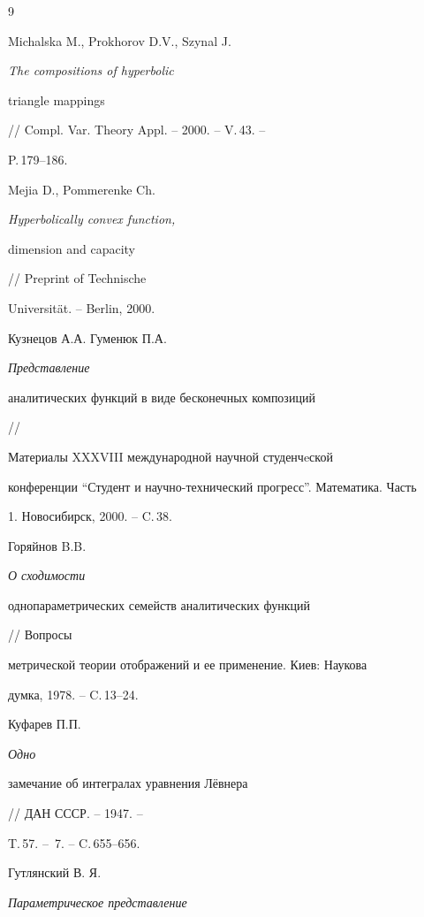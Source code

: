 \begin{thebibliography}{9}







Michalska M., Prokhorov D.V., Szynal J. {\em The compositions of hyperbolic


triangle mappings} // Compl. Var. Theory Appl. -- 2000. -- V.\,43. --


P.\,179--186.







Mejia D., Pommerenke Ch. {\em Hyperbolically convex function,


dimension and capacity} // Preprint of Technische


Universit\"{a}t. -- Berlin, 2000.







Кузнецов А.А. Гуменюк П.А. {\em Представление


аналитических функций в виде бесконечных композиций} //


Материалы XXXVIII международной научной студенчeской 


конференции ``Студент и научно-технический прогресс''. Математика. Часть


1. Новосибирск, 2000. -- C.\,38. 







Горяйнов B.B. {\em О сходимости


однопараметрических семейств аналитических функций} // Вопросы


метрической теории отображений и ее применение. Киев: Наукова


думка, 1978. -- C.\,13--24.







Куфарев П.П. {\em Одно


замечание об интегралах уравнения Л\"евнера} // ДАН СССР. -- 1947. --


T.\,57. -- \No\,7. -- C.\,655--656.







Гутлянский В. Я. {\em Параметрическое представление


}
\end{thebibliography}
